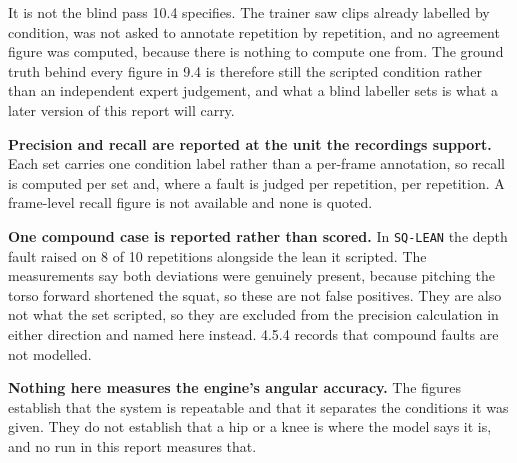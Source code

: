 It is not the blind pass 10.4 specifies. The trainer saw clips already labelled by condition, was not asked to annotate repetition by repetition, and no agreement figure was computed, because there is nothing to compute one from. The ground truth behind every figure in 9.4 is therefore still the scripted condition rather than an independent expert judgement, and what a blind labeller sets is what a later version of this report will carry.

\textbf{Precision and recall are reported at the unit the recordings support.} Each set carries one condition label rather than a per-frame annotation, so recall is computed per set and, where a fault is judged per repetition, per repetition. A frame-level recall figure is not available and none is quoted.

\textbf{One compound case is reported rather than scored.} In \texttt{SQ-\allowbreak{}LEAN} the depth fault raised on 8 of 10 repetitions alongside the lean it scripted. The measurements say both deviations were genuinely present, because pitching the torso forward shortened the squat, so these are not false positives. They are also not what the set scripted, so they are excluded from the precision calculation in either direction and named here instead. 4.5.4 records that compound faults are not modelled.

\textbf{Nothing here measures the engine's angular accuracy.} The figures establish that the system is repeatable and that it separates the conditions it was given. They do not establish that a hip or a knee is where the model says it is, and no run in this report measures that.
